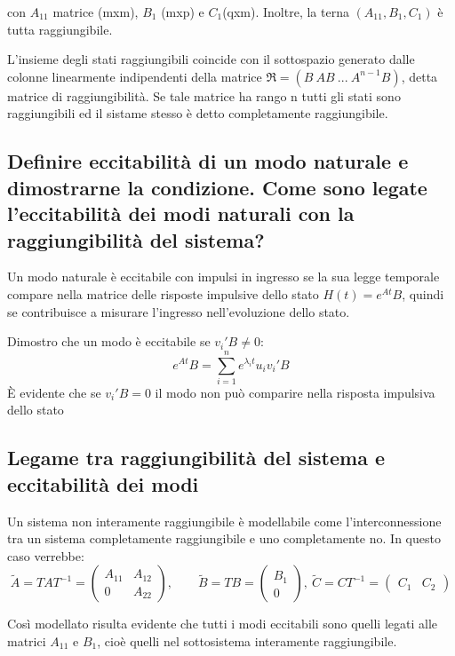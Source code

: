 \documentclass{article}
\begin{document}
con $A_{11}$ matrice (mxm), $B_1$ (mxp) e $C_1$(qxm). Inoltre, la terna $(A_{11},B_1,C_1)$ è tutta raggiungibile.

L'insieme degli stati raggiungibili coincide con il sottospazio generato dalle colonne
linearmente indipendenti della matrice $\mathfrak{R}=(B\ AB\ ...\ A^{n-1}B)$, 
detta matrice di raggiungibilità. Se tale matrice ha rango n tutti gli stati sono raggiungibili
ed il sistame stesso è detto completamente raggiungibile.


\subsection{Definire eccitabilità di un modo naturale e dimostrarne la condizione. Come sono legate l'eccitabilità dei modi naturali con la raggiungibilità del sistema?}
Un modo naturale è eccitabile con impulsi in ingresso se la sua legge temporale compare
nella matrice delle risposte impulsive dello stato $ H(t)=e^{A t}B$,
quindi se contribuisce a misurare l'ingresso nell'evoluzione dello stato.

Dimostro che un modo è eccitabile se $v_i'B\neq 0$:
\[ e^{At}B = \sum_{i=1}^{n}e^{\lambda_i t} u_i v_i'B \]
È evidente che se  $v_i'B = 0$ il modo non può comparire nella risposta impulsiva dello stato

\subsection{Legame tra raggiungibilità del sistema e eccitabilità dei modi}

Un sistema non interamente raggiungibile è modellabile come l'interconnessione tra un sistema
completamente raggiungibile e uno completamente no.
In questo caso verrebbe: 
\[
\widetilde{A} = TAT^{-1}= \begin{pmatrix}
A_{11} & A_{12}\\
0 & A_{22}
\end{pmatrix}
,
\hspace{2em}
\widetilde{B} = TB = \begin{pmatrix}
B_1\\
0
\end{pmatrix},\ 
\widetilde{C}= CT^{-1} = \begin{pmatrix}
C_1 & C_2
\end{pmatrix}
\]

Così modellato risulta evidente che tutti i modi eccitabili sono quelli legati alle matrici $A_{11}$ e $B_1$,
cioè quelli nel sottosistema interamente raggiungibile.
\end{document}
